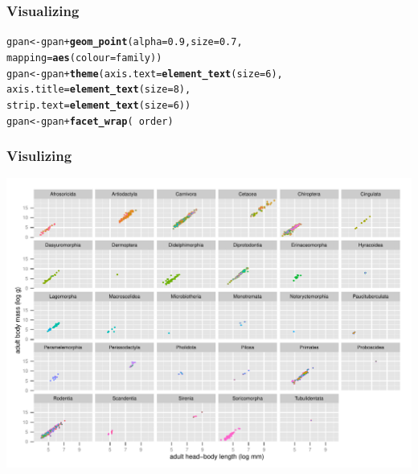 \documentclass{beamer}\usepackage{graphicx, color}
\makeatletter
\def\maxwidth{ %
  \ifdim\Gin@nat@width>\linewidth
    \linewidth
  \else
    \Gin@nat@width
  \fi
}
\newcommand{\hlfunctioncall}[1]{\textcolor[rgb]{0.501960784313725,0,0.329411764705882}{\textbf{#1}}}%
\newenvironment{kframe}{%
 \def\at@end@of@kframe{}%
 \ifinner\ifhmode%
  \def\at@end@of@kframe{\end{minipage}}%
  \begin{minipage}{\columnwidth}%
 \fi\fi%
 \def\FrameCommand##1{\hskip\@totalleftmargin \hskip-\fboxsep
 \colorbox{shadecolor}{##1}\hskip-\fboxsep
     \hskip-\linewidth \hskip-\@totalleftmargin \hskip\columnwidth}%
 \MakeFramed {\advance\hsize-\width
   \@totalleftmargin\z@ \linewidth\hsize
   \@setminipage}}%
 {\par\unskip\endMakeFramed%
 \at@end@of@kframe}
\newenvironment{knitrout}{}{} %
\makeatother
\begin{document}
\begin{frame}[fragile]
  \frametitle{Visualizing}
\begin{knitrout}\scriptsize
{}\color{fgcolor}\begin{kframe}
\begin{alltt}
gpan <- gpan + \hlfunctioncall{geom_point}(alpha = 0.9, size = 0.7,
                          mapping = \hlfunctioncall{aes}(colour = family))
gpan <- gpan + \hlfunctioncall{theme}(axis.text = \hlfunctioncall{element_text}(size = 6),
                     axis.title = \hlfunctioncall{element_text}(size = 8),
                     strip.text = \hlfunctioncall{element_text}(size = 6))
gpan <- gpan + \hlfunctioncall{facet_wrap}(~ order)
\end{alltt}
\end{kframe}
\end{knitrout}

\end{frame}

\begin{frame}[fragile]
  \frametitle{Visulizing}
\begin{knitrout}\scriptsize
{}\color{fgcolor}
\includegraphics[width=\maxwidth]{figure/unnamed-chunk-23} 

\end{knitrout}

\end{frame}
\end{document}
